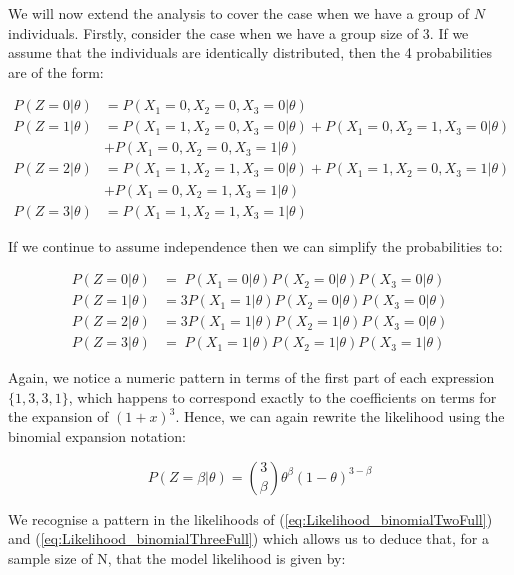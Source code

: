 \documentclass[11pt,fullpage]{book}
\begin{document}
We will now extend the analysis to cover the case when we have a group of $N$ individuals. Firstly, consider the case when we have a group size of 3. If we assume that the individuals are identically distributed, then the 4 probabilities are of the form:

\begin{equation}
\begin{align}
P(Z = 0|\theta)& = P(X_1=0,X_2=0,X_3=0|\theta)\\
P(Z = 1|\theta)& = P(X_1=1,X_2=0,X_3=0|\theta)+P(X_1=0,X_2=1,X_3=0|\theta)\\
&  + P(X_1=0,X_2=0,X_3=1|\theta)\\
P(Z = 2|\theta)& = P(X_1=1,X_2=1,X_3=0|\theta) + P(X_1=1,X_2=0,X_3=1|\theta)\\
& + P(X_1=0,X_2=1,X_3=1|\theta)\\
P(Z = 3|\theta)& = P(X_1=1,X_2=1,X_3=1|\theta)
\end{align}
\end{equation}\label{eq:Likelihood_binomialThreeProbsSimple}

If we continue to assume independence then we can simplify the probabilities to:

\begin{equation}
\begin{align}
P(Z = 0|\theta)& = \;P(X_1=0|\theta) P(X_2=0|\theta)  P(X_3=0|\theta)\\
P(Z = 1|\theta)& = 3P(X_1=1|\theta) P(X_2=0|\theta)  P(X_3=0|\theta)\\
P(Z = 2|\theta)& = 3P(X_1=1|\theta) P(X_2=1|\theta)  P(X_3=0|\theta)\\
P(Z = 3|\theta)& = \;P(X_1=1|\theta)P(X_2=1|\theta) P(X_3=1|\theta)
\end{align}
\end{equation}\label{eq:Likelihood_binomialThreeProbsSimpler}

Again, we notice a numeric pattern in terms of the first part of each expression $\{1,3,3,1\}$, which happens to correspond exactly to the coefficients on terms for the expansion of $(1+x)^3$. Hence, we can again rewrite the likelihood using the binomial expansion notation:

\begin{equation}
P(Z=\beta|\theta) = {3 \choose \beta} \theta^\beta (1-\theta)^{3-\beta}
\end{equation}\label{eq:Likelihood_binomialThreeFull}

We recognise a pattern in the likelihoods of (\ref{eq:Likelihood_binomialTwoFull}) and (\ref{eq:Likelihood_binomialThreeFull}) which allows us to deduce that, for a sample size of N, that the model likelihood is given by:
\end{document}
